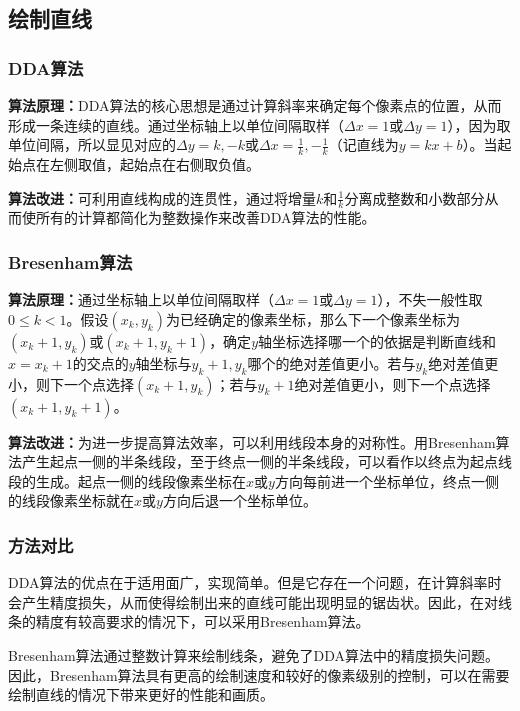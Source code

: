 \documentclass[a4paper,UTF8]{article}
\theoremstyle{definition}
\begin{document}
\subsection{绘制直线}

\subsubsection{DDA算法}

\textbf{算法原理：}DDA算法的核心思想是通过计算斜率来确定每个像素点的位置，从而形成一条连续的直线。通过坐标轴上以单位间隔取样（$\Delta x = 1$或$\Delta y = 1$），因为取单位间隔，所以显见对应的$\Delta y = k, -k$或$\Delta x = \frac{1}{k},-\frac{1}{k}$（记直线为$y=kx+b$）。当起始点在左侧取值，起始点在右侧取负值。

\textbf{算法改进：}可利用直线构成的连贯性，通过将增量$k$和$\frac{1}{k}$分离成整数和小数部分从而使所有的计算都简化为整数操作来改善DDA算法的性能。

\subsubsection{Bresenham算法}

\textbf{算法原理：}通过坐标轴上以单位间隔取样（$\Delta x = 1$或$\Delta y = 1$），不失一般性取$0\leq k<1$。假设$(x_k,y_k)$为已经确定的像素坐标，那么下一个像素坐标为$(x_{k}+1,y_k)$或$(x_k+1,y_k+1)$，确定$y$轴坐标选择哪一个的依据是判断直线和$x=x_k+1$的交点的$y$轴坐标与$y_k+1,y_k$哪个的绝对差值更小。若与$y_k$绝对差值更小，则下一个点选择$(x_k+1,y_k)$；若与$y_k+1$绝对差值更小，则下一个点选择$(x_k+1,y_k+1)$。

\textbf{算法改进：}为进一步提高算法效率，可以利用线段本身的对称性。用Bresenham算法产生起点一侧的半条线段，至于终点一侧的半条线段，可以看作以终点为起点线段的生成。起点一侧的线段像素坐标在$x$或$y$方向每前进一个坐标单位，终点一侧的线段像素坐标就在$x$或$y$方向后退一个坐标单位。

\subsubsection{方法对比}

DDA算法的优点在于适用面广，实现简单。但是它存在一个问题，在计算斜率时会产生精度损失，从而使得绘制出来的直线可能出现明显的锯齿状。因此，在对线条的精度有较高要求的情况下，可以采用Bresenham算法。

Bresenham算法通过整数计算来绘制线条，避免了DDA算法中的精度损失问题。因此，Bresenham算法具有更高的绘制速度和较好的像素级别的控制，可以在需要绘制直线的情况下带来更好的性能和画质。
\end{document}
